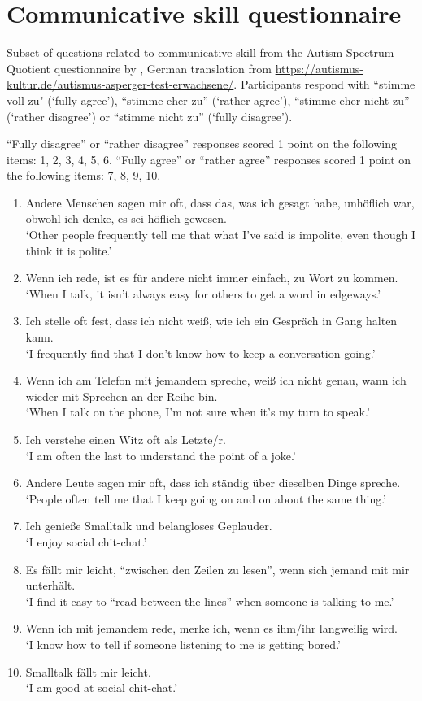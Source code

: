 \section{Communicative skill questionnaire}


Subset of questions related to communicative skill from the Autism-Spectrum Quotient questionnaire by \citet{baron-cohenAutismSpectrumQuotientAQ2006}, German translation from \url{https://autismus-kultur.de/autismus-asperger-test-erwachsene/}. Participants respond with “stimme voll zu" (`fully agree'), “stimme eher zu” (`rather agree'), “stimme eher nicht zu” (`rather disagree') or “stimme nicht zu” (`fully disagree').

``Fully disagree” or “rather disagree” responses scored 1 point on the following items: 1, 2, 3, 4, 5, 6. “Fully agree” or “rather agree” responses scored 1 point on the following items: 7, 8, 9, 10.

\begin{enumerate}
\item Andere Menschen sagen mir oft, dass das, was ich gesagt habe, unhöflich war, obwohl ich denke, es sei höflich gewesen.\\
`Other people frequently tell me that what I’ve said is impolite, even though I think it is polite.'
\item Wenn ich rede, ist es für andere nicht immer einfach, zu Wort zu kommen.\\
`When I talk, it isn’t always easy for others to get a word in edgeways.'
\item Ich stelle oft fest, dass ich nicht weiß, wie ich ein Gespräch in Gang halten kann.\\
`I frequently find that I don’t know how to keep a conversation going.'
\item Wenn ich am Telefon mit jemandem spreche, weiß ich nicht genau, wann ich wieder mit Sprechen an der Reihe bin.\\
`When I talk on the phone, I’m not sure when it’s my turn to speak.'
\item Ich verstehe einen Witz oft als Letzte/r.\\
`I am often the last to understand the point of a joke.'
\item Andere Leute sagen mir oft, dass ich ständig über dieselben Dinge spreche.\\
`People often tell me that I keep going on and on about the same thing.'
\item Ich genieße Smalltalk und belangloses Geplauder.\\
`I enjoy social chit-chat.'
\item Es fällt mir leicht, “zwischen den Zeilen zu lesen”, wenn sich jemand mit mir unterhält.\\
`I find it easy to “read between the lines” when someone is talking to me.'
\item Wenn ich mit jemandem rede, merke ich, wenn es ihm/ihr langweilig wird.\\
`I know how to tell if someone listening to me is getting bored.'
\item Smalltalk fällt mir leicht.\\
`I am good at social chit-chat.'
\end{enumerate}
